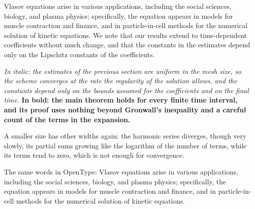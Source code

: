 \documentclass{article}
\begin{document}
\selectfont
Vlasov equations arise in various applications, including the social sciences,
biology, and plasma physics; specifically, the equation appears in models for
muscle contraction and finance, and in particle-in-cell methods for the
numerical solution of kinetic equations. We note that our results extend to
time-dependent coefficients without much change, and that the constants in the
estimates depend only on the Lipschitz constants of the coefficients.

\textit{In italic: the estimates of the previous section are uniform in the
mesh size, so the scheme converges at the rate the regularity of the solution
allows, and the constants depend only on the bounds assumed for the
coefficients and on the final time.} \textbf{In bold: the main theorem holds
for every finite time interval, and its proof uses nothing beyond Gronwall's
inequality and a careful count of the terms in the expansion.}

{\small A smaller size has other widths again: the harmonic series diverges,
though very slowly, its partial sums growing like the logarithm of the number
of terms, while its terms tend to zero, which is not enough for convergence.\par}

\selectfont
The same words in OpenType: Vlasov equations arise in various applications,
including the social sciences, biology, and plasma physics; specifically, the
equation appears in models for muscle contraction and finance, and in
particle-in-cell methods for the numerical solution of kinetic equations.
\end{document}
